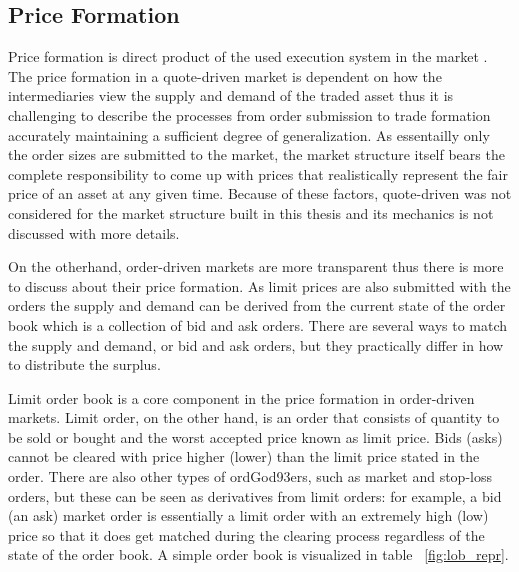 \subsection{Price Formation}
Price formation is direct product of the used execution system in the market
\citep{boer05}. The price formation in a quote-driven market 
is dependent on how the intermediaries view the supply and demand of the traded
asset thus it is challenging to describe the processes from order submission
to trade formation accurately maintaining a sufficient degree of generalization.
As essentailly only the order sizes are submitted to the market, the market
structure itself bears the complete responsibility to come up with prices that realistically
represent the fair price of an asset at any given time. Because of these 
factors, quote-driven was not considered for the market structure built in this
thesis and its mechanics is not discussed with more details.

On the otherhand, order-driven markets are more transparent thus there is more
to discuss about their price formation. As limit prices are also submitted with 
the orders the supply and demand can be derived from the current state of the 
order book which is a collection of bid and ask orders. There are several ways 
to match the supply and demand, or bid and ask orders, but they practically differ 
in how to distribute the surplus.

Limit order book is a core component in the price formation in order-driven markets.
Limit order, on the other hand, is an order that consists of quantity to be sold or bought 
and the worst accepted price known as limit price. Bids (asks) cannot be cleared with
price higher (lower) than the limit price stated in the order. There are also
other types of ordGod93ers, such as market and stop-loss orders, but these can be seen as 
derivatives from limit orders: for example, a bid (an ask) market order is essentially a limit order 
with an extremely high (low) price so that it does get matched during the clearing process 
regardless of the state of the order book. \citep{lob13} A simple order book is visualized in 
table ~\ref{fig:lob_repr}. 


